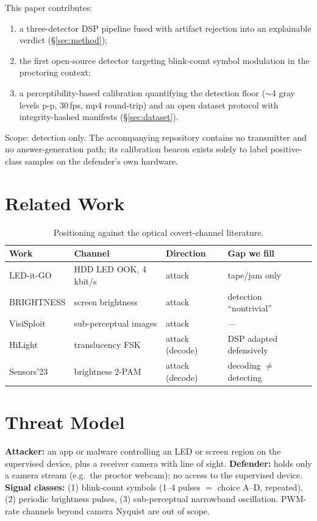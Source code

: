 \documentclass[10pt]{article}
\begin{document}
This paper contributes:
\begin{enumerate}
  \item a three-detector DSP pipeline fused with artifact rejection into an
        explainable verdict (\S\ref{sec:method});
  \item the first open-source detector targeting blink-count symbol
        modulation in the proctoring context;
  \item a perceptibility-based calibration quantifying the detection floor
        ($\sim$4 gray levels p-p, 30\,fps, mp4 round-trip) and an
        open dataset protocol with integrity-hashed manifests
        (\S\ref{sec:dataset}).
\end{enumerate}
Scope: detection only. The accompanying repository contains no transmitter and
no answer-generation path; its calibration beacon exists solely to label
positive-class samples on the defender's own hardware.

\section{Related Work}
\begin{table}[h]
\centering
\small
\begin{tabular}{@{}llll@{}}
\toprule
Work & Channel & Direction & Gap we fill \\
\midrule
LED-it-GO \cite{leditgo2017} & HDD LED OOK, 4\,kbit/s & attack & tape/jam only \\
BRIGHTNESS \cite{brightness2020} & screen brightness & attack & detection ``nontrivial'' \\
VisiSploit \cite{visisploit2016} & sub-perceptual images & attack & --- \\
HiLight \cite{hilight2016} & translucency FSK & attack (decode) & DSP adapted defensively \\
Sensors'23 \cite{receiver2023} & brightness 2-PAM & attack (decode) & decoding $\neq$ detecting \\
\bottomrule
\end{tabular}
\caption{Positioning against the optical covert-channel literature.}
\label{tab:related}
\end{table}

\section{Threat Model}
\textbf{Attacker:} an app or malware controlling an LED or screen region on the
supervised device, plus a receiver camera with line of sight.
\textbf{Defender:} holds only a camera stream (e.g.\ the proctor webcam); no
access to the supervised device. \textbf{Signal classes:} (1) blink-count
symbols (1--4 pulses $=$ choice A--D, repeated), (2) periodic brightness
pulses, (3) sub-perceptual narrowband oscillation. PWM-rate channels beyond
camera Nyquist are out of scope.
\end{document}
